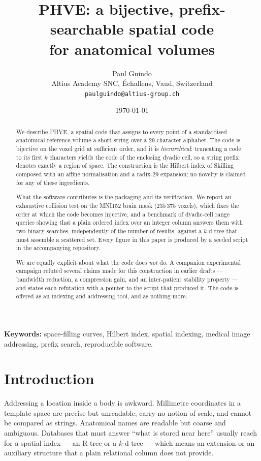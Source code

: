 \documentclass[11pt,a4paper]{article}
\title{PHVE: a bijective, prefix-searchable spatial code\\
for anatomical volumes}
\author{Paul Guindo\\
\small Altius Academy SNC, Échallens, Vaud, Switzerland\\
\small \texttt{paulguindo@altius-group.ch}}
\date{\today}
\theoremstyle{plain}
\theoremstyle{definition}
\theoremstyle{remark}
\begin{document}
\maketitle

\begin{abstract}
We describe PHVE, a spatial code that assigns to every point of a
standardised anatomical reference volume a short string over a
29-character alphabet. The code is bijective on the voxel grid at
sufficient order, and it is \emph{hierarchical}: truncating a code to its
first $k$ characters yields the code of the enclosing dyadic cell, so a
string prefix denotes exactly a region of space. The construction is the
Hilbert index of Skilling composed with an affine normalisation and a
radix-29 expansion; no novelty is claimed for any of these ingredients.

What the software contributes is the packaging and its verification. We
report an exhaustive collision test on the MNI152 brain mask
($235\,375$ voxels), which fixes the order at which the code becomes
injective, and a benchmark of dyadic-cell range queries showing that a
plain ordered index over an integer column answers them with two binary
searches, independently of the number of results, against a
$k$-d tree that must assemble a scattered set. Every figure in this paper
is produced by a seeded script in the accompanying repository.

We are equally explicit about what the code does \emph{not} do. A companion
experimental campaign refuted several claims made for this construction in
earlier drafts --- bandwidth reduction, a compression gain, and an
inter-patient stability property --- and  states each
refutation with a pointer to the script that produced it. The code is
offered as an indexing and addressing tool, and as nothing more.
\end{abstract}

\noindent\textbf{Keywords:} space-filling curves, Hilbert index, spatial
indexing, medical image addressing, prefix search, reproducible software.

\section{Introduction}

Addressing a location inside a body is awkward. Millimetre coordinates in a
template space are precise but unreadable, carry no notion of scale, and
cannot be compared as strings. Anatomical names are readable but coarse and
ambiguous. Databases that must answer ``what is stored near here'' usually
reach for a spatial index --- an R-tree or a $k$-d tree --- which means an
extension or an auxiliary structure that a plain relational column does not
provide.
\end{document}
